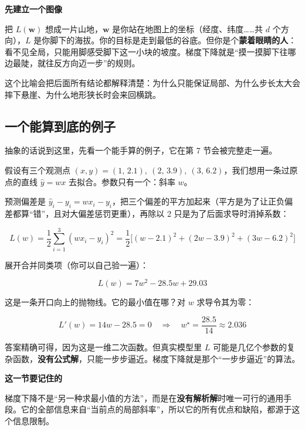 \documentclass[UTF8, a4paper, zihao=-4, fontset=none]{ctexart}
\begin{document}
\begin{infobox}
{\bfseries\sffamily\small\color{accent} 先建立一个图像}\par\vspace{2pt}
把 $L(\mathbf{w})$ 想成一片山地，$\mathbf{w}$ 是你站在地图上的坐标（经度、纬度……共 $d$ 个方向），$L$ 是你脚下的海拔。你的目标是走到最低的谷底。但你是个\textbf{蒙着眼睛的人}：看不见全局，只能用脚感受脚下这一小块的坡度。梯度下降就是“摸一摸脚下往哪边最陡，就往反方向迈一步”的规则。


这个比喻会把后面所有结论都解释清楚：为什么只能保证局部、为什么步长太大会摔下悬崖、为什么地形狭长时会来回横跳。


\end{infobox}




\subsection{一个能算到底的例子}



抽象的话说到这里，先看一个能手算的例子，它在第 7 节会被完整走一遍。



假设有三个观测点 $(x,y)=(1,\,2.1),\ (2,\,3.9),\ (3,\,6.2)$，我们想用一条过原点的直线 $\hat{y}=wx$ 去拟合。参数只有一个：斜率 $w$。



预测偏差是 $\hat{y}_i-y_i=wx_i-y_i$，把三个偏差的平方加起来（平方是为了让正负偏差都算“错”，且对大偏差惩罚更重），再除以 2 只是为了后面求导时消掉系数：


\[
L(w)=\frac{1}{2}\sum_{i=1}^{3}(wx_i-y_i)^2
=\frac12\Big[(w-2.1)^2+(2w-3.9)^2+(3w-6.2)^2\Big]
\]


展开合并同类项（你可以自己验一遍）：


\[
L(w)=7w^2-28.5w+29.03
\]


这是一条开口向上的抛物线。它的最小值在哪？对 $w$ 求导令其为零：


\[
L'(w)=14w-28.5=0\quad\Longrightarrow\quad w^\star=\frac{28.5}{14}\approx 2.036
\]


答案精确可得，因为这是一维二次函数。但真实模型里 $L$ 可能是几亿个参数的复杂函数，\textbf{没有公式解}，只能一步步逼近。梯度下降就是那个“一步步逼近”的算法。



\begin{goodbox}
{\bfseries\sffamily\small\color{good} 这一节要记住的}\par\vspace{2pt}
梯度下降不是“另一种求最小值的方法”，而是在\textbf{没有解析解}时唯一可行的通用手段。它的全部信息来自“当前点的局部斜率”，所以它的所有优点和缺陷，都源于这个信息限制。


\end{goodbox}
\end{document}
